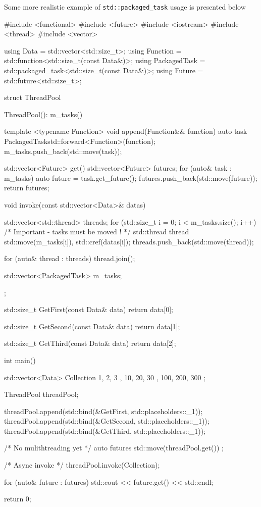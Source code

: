 \documentclass[../main]{subfiles}
\begin{document}
    Some more realistic example of \texttt{std::packaged\_task} usage is presented below
\begin{Code}
    #include <functional>
    #include <future>
    #include <iostream>
    #include <thread>
    #include <vector>

    using Data = std::vector<std::size_t>;
    using Function = std::function<std::size_t(const Data&)>;
    using PackagedTask = std::packaged_task<std::size_t(const Data&)>;
    using Future = std::future<std::size_t>;

    struct ThreadPool
    {
        ThreadPool(): m_tasks()
        {
        }

        template <typename Function>
        void append(Function&& function)
        {
            auto task {PackagedTask{std::forward<Function>(function)}};
            m_tasks.push_back(std::move(task));
        }

        std::vector<Future> get()
        {
            std::vector<Future> futures;
            for (auto& task : m_tasks)
            {
                auto future = task.get_future();
                futures.push_back(std::move(future));
            }
            return futures;
        }

        void invoke(const std::vector<Data>& datas)
        {
            std::vector<std::thread> threads;
            for (std::size_t i = 0; i < m_tasks.size(); i++)
            {
                /* Important - tasks must be moved ! */
                std::thread thread {std::move(m_tasks[i]),
                    std::cref(datas[i])};
                threads.push_back(std::move(thread));
            }

            for (auto& thread : threads)
            {
                thread.join();
            }
        }

        std::vector<PackagedTask> m_tasks;
    };

    std::size_t GetFirst(const Data& data)
    {
        return data[0];
    }

    std::size_t GetSecond(const Data& data)
    {
        return data[1];
    }

    std::size_t GetThird(const Data& data)
    {
        return data[2];
    }

    int main()
    {
        std::vector<Data> Collection
        {
            { 1, 2, 3 },
            { 10, 20, 30 },
            { 100, 200, 300 }
        };

        ThreadPool threadPool;

        threadPool.append(std::bind(&GetFirst,  std::placeholders::_1));
        threadPool.append(std::bind(&GetSecond, std::placeholders::_1));
        threadPool.append(std::bind(&GetThird,  std::placeholders::_1));

        /* No mulithtreading yet */
        auto futures { std::move(threadPool.get()) };

        /* Async invoke */
        threadPool.invoke(Collection);

        for (auto& future : futures)
        {
            std::cout << future.get() << std::endl;
        }

        return 0;
    }
\end{Code}
\end{document}
